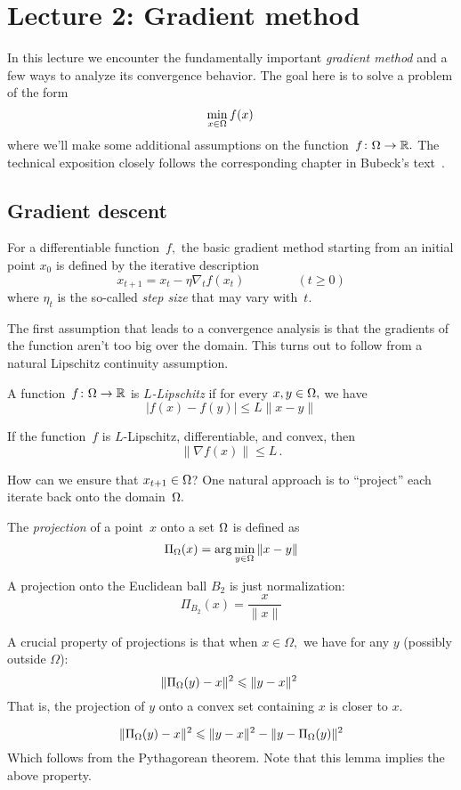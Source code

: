 \section{Lecture 2: Gradient method}

In this lecture we encounter the fundamentally important \emph{gradient method}
and a few ways to analyze its convergence behavior.
The goal here is to solve a problem of the form
\[
\min_{x\in\Omega} f(x)\,
\]
where we'll make some additional assumptions on the
function~$f\colon\Omega\to\mathbb{R}.$ The technical exposition closely follows the
corresponding chapter in Bubeck's text~\cite{Bubeck}.

\subsection{Gradient descent}

For a differentiable function~$f,$ the basic gradient method starting from an
initial point $x_0$ is defined by the iterative description
\[
x_{t+1} = x_t - \eta \nabla_t f(x_t)\,\qquad\qquad(t\ge 0)
\]
where $\eta_t$ is the so-called \emph{step size} that may vary with~$t.$

The first assumption that leads to a convergence analysis is that the gradients
of the function aren't too big over the domain. This turns out to follow from a
natural Lipschitz continuity assumption.

\begin{definition}[$L$-Lipschitz]
A function~$f\colon\Omega\to\mathbb{R}$ is \emph{$L$-Lipschitz} if for every
$x,y\in\Omega,$ we have
\[
|f(x) - f(y)| \leq L \|x - y\|
\]
\end{definition}

\begin{fact}
If the function~$f$ is $L$-Lipschitz, differentiable, and convex, then
\[
\|\nabla f(x)\| \leq L\,.
\]
\end{fact}

How can we ensure that $x_{t+1}\in\Omega$?  One natural approach is to
``project'' each iterate back onto the domain~$\Omega.$

\begin{definition}[Projection]
The \emph{projection} of a point~$x$ onto a set $\Omega$ is defined as
\[
\Pi_{\Omega}(x) = \arg\min_{y\in\Omega} \|x-y\|
\]
\end{definition}

\begin{example}
A projection onto the Euclidean ball $B_2$ is just normalization:
\[
\Pi_{B_2}(x) = \dfrac{x}{\|x\|}
\]
\end{example}
%
A crucial property of projections is that when $x\in\Omega,$ we have for any $y$
(possibly outside $\Omega$):
\[
\| \Pi_{\Omega}(y) - x \|^2 \leqslant \| y - x \|^2\
\]
That is, the projection of $y$ onto a convex set containing $x$ is closer to $x$. 
%
\begin{lemma}
\[
\| \Pi_{\Omega}(y) - x \|^2 \leqslant \| y - x \|^2 - \| y - \Pi_{\Omega}(y) \|^2
\]
Which follows from the Pythagorean theorem. Note that this lemma implies the above property.
\end{lemma}


